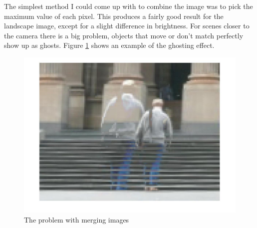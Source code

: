 \documentclass[12pt]{article}
\begin{document}
The simplest method I could come up with to combine the image was to pick the maximum value of each pixel. This produces a fairly good result for the landscape image, except for a slight difference in brightness. For scenes closer to the camera there is a big problem, objects that move or don't match perfectly show up as ghosts. Figure \ref{fig_ghost} shows an example of the ghosting effect.

\begin{figure}[t!]
    \centering
    \includegraphics[width=0.5\linewidth]{img/set1_ghost2}
    \caption{The problem with merging images}
    \label{fig_ghost}
\end{figure}
\end{document}
